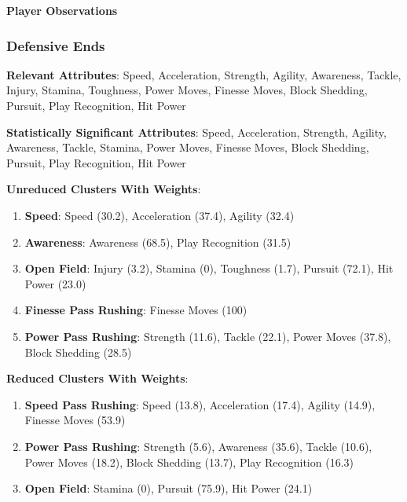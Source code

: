 \documentclass[11pt]{article}
\begin{document}
\textbf{Player Observations}

\subsubsection{Defensive Ends}

\textbf{Relevant Attributes}: Speed, Acceleration, Strength, Agility, Awareness, Tackle, Injury, Stamina, Toughness, Power Moves, Finesse Moves, Block Shedding, Pursuit, Play Recognition, Hit Power

\textbf{Statistically Significant Attributes}: Speed, Acceleration, Strength, Agility, Awareness, Tackle, Stamina, Power Moves, Finesse Moves, Block Shedding, Pursuit, Play Recognition, Hit Power

\textbf{Unreduced Clusters With Weights}:

\begin{enumerate}
\item{\textbf{Speed}}: Speed (30.2), Acceleration (37.4), Agility (32.4)
\item{\textbf{Awareness}}: Awareness (68.5), Play Recognition (31.5)
\item{\textbf{Open Field}}: Injury (3.2), Stamina (0), Toughness (1.7), Pursuit (72.1), Hit Power (23.0)
\item{\textbf{Finesse Pass Rushing}}: Finesse Moves (100)
\item{\textbf{Power Pass Rushing}}: Strength (11.6), Tackle (22.1), Power Moves (37.8), Block Shedding (28.5)
\end{enumerate}

\textbf{Reduced Clusters With Weights}:

\begin{enumerate}
\item{\textbf{Speed Pass Rushing}}: Speed (13.8), Acceleration (17.4), Agility (14.9), Finesse Moves (53.9)
\item{\textbf{Power Pass Rushing}}: Strength (5.6), Awareness (35.6), Tackle (10.6), Power Moves (18.2), Block Shedding (13.7), Play Recognition (16.3)
\item{\textbf{Open Field}}: Stamina (0), Pursuit (75.9), Hit Power (24.1)

\end{enumerate}
\end{document}
